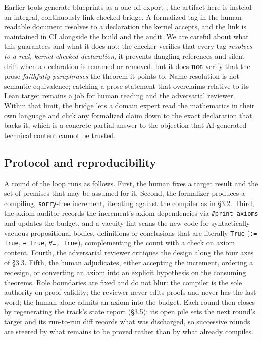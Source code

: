 \documentclass[11pt]{article}
\begin{document}
Earlier tools generate blueprints as a one-off export \cite{r31,r44}; the artifact here is instead an
integral, continuously-link-checked bridge. A formalized tag in the human-readable document resolves
to a declaration the kernel accepts, and the link is maintained in CI alongside the build and the
audit. We are careful about what this guarantees and what it does not: the checker verifies that
every tag \emph{resolves to a real, kernel-checked declaration}, it prevents dangling references and
silent drift when a declaration is renamed or removed, but it does \textbf{not} verify that the prose
\emph{faithfully paraphrases} the theorem it points to. Name resolution is not semantic equivalence;
catching a prose statement that overclaims relative to its Lean target remains a job for human
reading and the adversarial reviewer. Within that limit, the bridge lets a domain expert read the
mathematics in their own language and click any formalized claim down to the exact declaration that
backs it, which is a concrete partial answer to the objection that AI-generated technical content
cannot be trusted.

\subsection{Protocol and reproducibility}

A round of the loop runs as follows. First, the human fixes a target result and the set of premises
that may be assumed for it. Second, the formalizer produces a compiling, \texttt{sorry}-free increment,
iterating against the compiler as in §3.2. Third, the axiom auditor records the increment's axiom
dependencies via \texttt{\#print axioms} and updates the budget, and a vacuity lint scans the new code for
syntactically vacuous propositional bodies, definitions or conclusions that are literally \texttt{True}
(\texttt{:= True}, \texttt{→ True}, \texttt{∀…, True}), complementing the count with a check on axiom content. Fourth, the adversarial reviewer critiques the design along the four axes of §3.3.
Fifth, the human adjudicates, either accepting the increment, ordering a redesign, or converting an
axiom into an explicit hypothesis on the consuming theorems. Role boundaries are fixed and do not
blur: the compiler is the sole authority on proof validity; the reviewer never edits proofs and
never has the last word; the human alone admits an axiom into the budget. Each round then closes by
regenerating the track's state report (§3.5); its open pile sets the next round's target and its
run-to-run diff records what was discharged, so successive rounds are steered by what remains to be
proved rather than by what already compiles.
\end{document}
